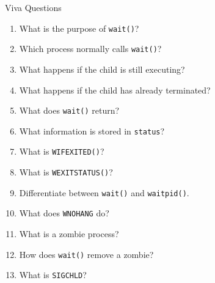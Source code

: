 \documentclass[aspectratio=169]{beamer}
\begin{document}
\begin{frame}{Viva Questions}

\small

\begin{enumerate}

    \item What is the purpose of \texttt{wait()}?

    \item Which process normally calls \texttt{wait()}?

    \item What happens if the child is still executing?

    \item What happens if the child has already terminated?

    \item What does \texttt{wait()} return?

    \item What information is stored in \texttt{status}?

    \item What is \texttt{WIFEXITED()}?

    \item What is \texttt{WEXITSTATUS()}?

    \item Differentiate between \texttt{wait()} and \texttt{waitpid()}.

    \item What does \texttt{WNOHANG} do?

    \item What is a zombie process?

    \item How does \texttt{wait()} remove a zombie?

    \item What is \texttt{SIGCHLD}?

\end{enumerate}

\end{frame}
\end{document}
